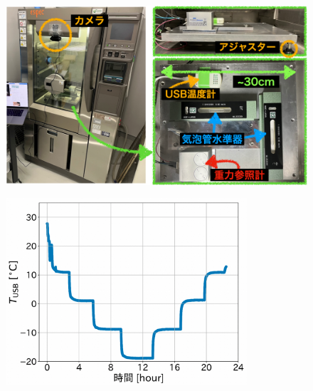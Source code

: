 \documentclass[../../main.tex]{subfiles}
\begin{document}
\begin{figure}[H]
    \centering
    \includegraphics[width=1.0\textwidth]{tiltsensor/temp_evaluation_system.pdf}
    \label{fig:temp_evaluation_system}
\end{figure}
\begin{figure}[H]
    \centering
    \includegraphics[width=0.8\textwidth]{tiltsensor/bath_temp_usb.pdf}
    \label{fig:bath_temp_usb}
\end{figure}
\end{document}
